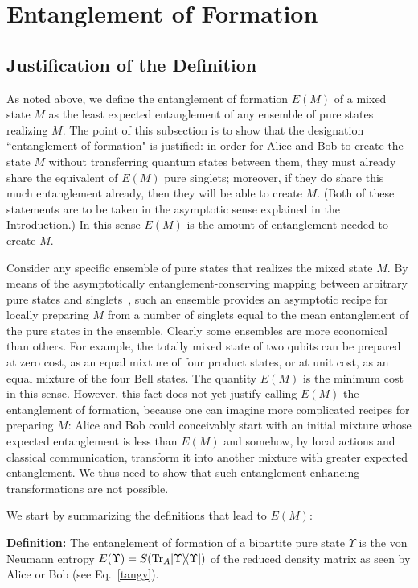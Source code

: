 \section{Entanglement of Formation}
\label{sec:EM}
 
\subsection{Justification of the Definition}
\label{subsec:EMa}
 
As noted above, we define the entanglement of formation $E(M)$ of a mixed
state $M$ as the least expected entanglement of any ensemble of pure states
realizing $M$.  The point of this subsection is to show that the 
designation ``entanglement of
formation" is justified: in order for Alice and Bob to create the state
$M$ without transferring quantum states between them, they must already
share the equivalent of $E(M)$ pure singlets; moreover, if they do
share this much entanglement already, then they will be able to create $M$.
(Both of these statements are to be taken in the asymptotic sense
explained in the Introduction.)  In this sense $E(M)$ is the amount of
entanglement needed to create $M$.
 
Consider any specific ensemble of pure states that realizes the mixed state
$M$.  By means of the asymptotically entanglement-conserving mapping between
arbitrary pure states and singlets~\cite{Concentration},
such an ensemble provides an asymptotic recipe for
locally preparing $M$ from a number of singlets equal to the mean
entanglement of the pure states in the ensemble. Clearly some ensembles
are more economical than others.  For example, the totally mixed state
of two qubits can be prepared at zero cost, as an equal mixture of four
product states, or at unit cost, as an equal mixture of the four Bell
states.   The quantity $E(M)$ is the minimum cost in this sense.
However, this fact does not yet justify calling $E(M)$ the entanglement
of formation, because one can imagine more complicated recipes for
preparing $M$: Alice and Bob could conceivably start with an initial
mixture whose expected entanglement is less than $E(M)$ and somehow,
by local actions and classical communication,
transform it into another mixture with greater expected entanglement.
We thus need to show that such entanglement-enhancing transformations 
are not possible.
 
We start by summarizing the definitions that lead to $E(M)$:
 
{\bf Definition:} The entanglement of formation of a
bipartite pure state $\Upsilon$ is the von Neumann entropy
$E(\Upsilon)=S({\rm Tr}_A| \Upsilon \rangle\! \langle \Upsilon |)$ of the reduced density matrix
as seen by Alice or Bob (see Eq.~\ref{tangy}).
 
